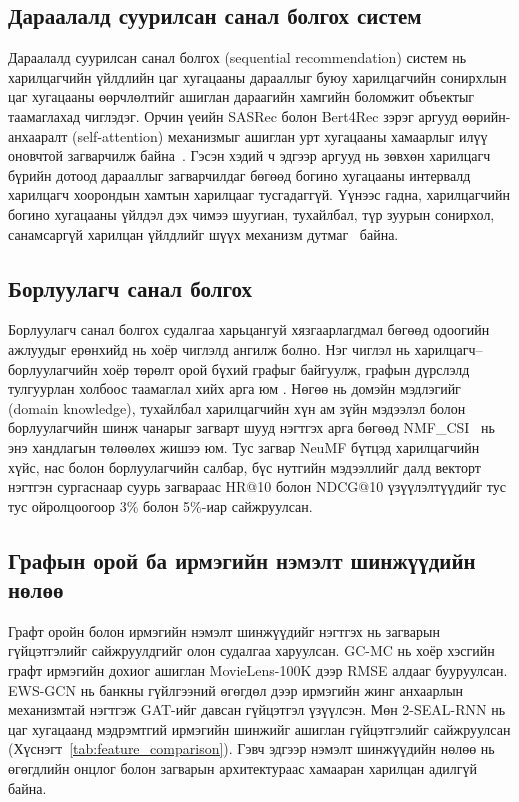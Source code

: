 \documentclass[conference]{IEEEtran}
\begin{document}
\subsection{Дараалалд суурилсан санал болгох систем}

Дараалалд суурилсан санал болгох (sequential recommendation) систем нь харилцагчийн үйлдлийн цаг хугацааны дарааллыг буюу харилцагчийн сонирхлын цаг хугацааны өөрчлөлтийг ашиглан дараагийн хамгийн боломжит объектыг таамаглахад чиглэдэг. Орчин үеийн SASRec болон Bert4Rec зэрэг аргууд өөрийн-анхааралт (self-attention) механизмыг ашиглан урт хугацааны хамаарлыг илүү оновчтой загварчилж байна~\cite{kang2018sasrec, sun2019bert4rec}. Гэсэн хэдий ч эдгээр аргууд нь зөвхөн харилцагч бүрийн дотоод дарааллыг загварчилдаг бөгөөд богино хугацааны интервалд харилцагч хоорондын хамтын харилцааг тусгадаггүй. Үүнээс гадна, харилцагчийн богино хугацааны үйлдэл дэх чимээ шуугиан, тухайлбал, түр зуурын сонирхол, санамсаргүй харилцан үйлдлийг шүүх механизм дутмаг~\cite{selfgnn2024} байна.

\subsection{Борлуулагч санал болгох}

Борлуулагч санал болгох судалгаа харьцангуй хязгаарлагдмал бөгөөд одоогийн ажлуудыг ерөнхийд нь хоёр чиглэлд ангилж болно. Нэг чиглэл нь харилцагч–борлуулагчийн хоёр төрөлт орой бүхий графыг байгуулж, графын дүрслэлд тулгуурлан холбоос таамаглал хийх арга юм \cite{yilmaz2023link}. Нөгөө нь домэйн мэдлэгийг (domain knowledge), тухайлбал харилцагчийн хүн ам зүйн мэдээлэл болон борлуулагчийн шинж чанарыг загварт шууд нэгтгэх арга бөгөөд NMF\_CSI~\cite{yoo2023merchant} нь энэ хандлагын төлөөлөх жишээ юм. Тус загвар NeuMF бүтцэд харилцагчийн хүйс, нас болон борлуулагчийн салбар, бүс нутгийн мэдээллийг далд векторт нэгтгэн сургаснаар суурь загвараас HR@10 болон NDCG@10 үзүүлэлтүүдийг тус тус ойролцоогоор 3\% болон 5\%-иар сайжруулсан.

\subsection{Графын орой ба ирмэгийн нэмэлт шинжүүдийн нөлөө}

Графт оройн болон ирмэгийн нэмэлт шинжүүдийг нэгтгэх нь загварын гүйцэтгэлийг сайжруулдгийг олон судалгаа харуулсан. GC-MC \cite{vandenberg2018gcmc} нь хоёр хэсгийн графт ирмэгийн дохиог ашиглан MovieLens-100K дээр RMSE алдааг бууруулсан. EWS-GCN \cite{sukharev2020ewsgcn} нь банкны гүйлгээний өгөгдөл дээр ирмэгийн жинг анхаарлын механизмтай нэгтгэж GAT-ийг \cite{velickovic2018gat} давсан гүйцэтгэл үзүүлсэн. Мөн 2-SEAL-RNN \cite{shumovskaia2021bank} нь цаг хугацаанд мэдрэмтгий ирмэгийн шинжийг ашиглан гүйцэтгэлийг сайжруулсан (Хүснэгт~\ref{tab:feature_comparison}). Гэвч эдгээр нэмэлт шинжүүдийн нөлөө нь өгөгдлийн онцлог болон загварын архитектураас хамааран харилцан адилгүй байна.
\end{document}
